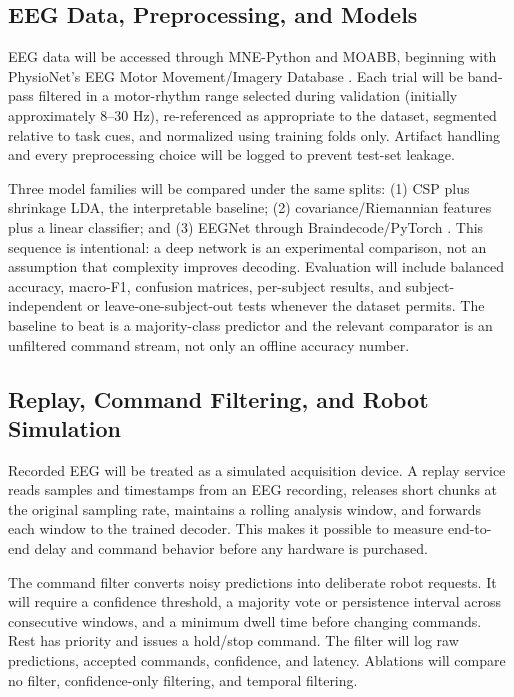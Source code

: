 \documentclass[11pt]{article}
\begin{document}
\subsection{EEG Data, Preprocessing, and Models}
EEG data will be accessed through MNE-Python and MOABB, beginning with PhysioNet's EEG Motor Movement/Imagery Database \citep{gramfort2013,schalk2009}. Each trial will be band-pass filtered in a motor-rhythm range selected during validation (initially approximately 8--30 Hz), re-referenced as appropriate to the dataset, segmented relative to task cues, and normalized using training folds only. Artifact handling and every preprocessing choice will be logged to prevent test-set leakage.

Three model families will be compared under the same splits: (1) CSP plus shrinkage LDA, the interpretable baseline; (2) covariance/Riemannian features plus a linear classifier; and (3) EEGNet through Braindecode/PyTorch \citep{lawhern2018,schirrmeister2017}. This sequence is intentional: a deep network is an experimental comparison, not an assumption that complexity improves decoding. Evaluation will include balanced accuracy, macro-F1, confusion matrices, per-subject results, and subject-independent or leave-one-subject-out tests whenever the dataset permits. The baseline to beat is a majority-class predictor and the relevant comparator is an unfiltered command stream, not only an offline accuracy number.

\subsection{Replay, Command Filtering, and Robot Simulation}
Recorded EEG will be treated as a simulated acquisition device. A replay service reads samples and timestamps from an EEG recording, releases short chunks at the original sampling rate, maintains a rolling analysis window, and forwards each window to the trained decoder. This makes it possible to measure end-to-end delay and command behavior before any hardware is purchased.

The command filter converts noisy predictions into deliberate robot requests. It will require a confidence threshold, a majority vote or persistence interval across consecutive windows, and a minimum dwell time before changing commands. Rest has priority and issues a hold/stop command. The filter will log raw predictions, accepted commands, confidence, and latency. Ablations will compare no filter, confidence-only filtering, and temporal filtering.
\end{document}
